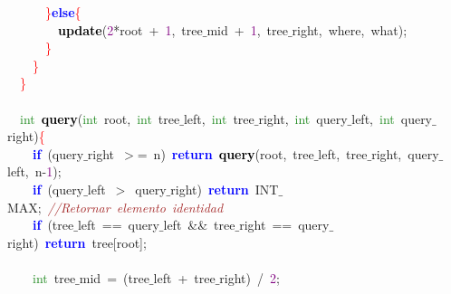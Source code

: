 {{\mbox{}\ \ \ \ \ \ \textcolor{Red}{\}}\textbf{\textcolor{Blue}{else}}\textcolor{Red}{\{} \\
\mbox{}\ \ \ \ \ \ \ \ \textbf{\textcolor{Black}{update}}\textcolor{BrickRed}{(}\textcolor{Purple}{2}\textcolor{BrickRed}{*}root\ \textcolor{BrickRed}{+}\ \textcolor{Purple}{1}\textcolor{BrickRed}{,}\ tree$\_$mid\ \textcolor{BrickRed}{+}\ \textcolor{Purple}{1}\textcolor{BrickRed}{,}\ tree$\_$right\textcolor{BrickRed}{,}\ where\textcolor{BrickRed}{,}\ what\textcolor{BrickRed}{);} \\
\mbox{}\ \ \ \ \ \ \textcolor{Red}{\}} \\
\mbox{}\ \ \ \ \textcolor{Red}{\}} \\
\mbox{}\ \ \textcolor{Red}{\}} \\
\mbox{} \\
\mbox{}\ \ \textcolor{ForestGreen}{int}\ \textbf{\textcolor{Black}{query}}\textcolor{BrickRed}{(}\textcolor{ForestGreen}{int}\ root\textcolor{BrickRed}{,}\ \textcolor{ForestGreen}{int}\ tree$\_$left\textcolor{BrickRed}{,}\ \textcolor{ForestGreen}{int}\ tree$\_$right\textcolor{BrickRed}{,}\ \textcolor{ForestGreen}{int}\ query$\_$left\textcolor{BrickRed}{,}\ \textcolor{ForestGreen}{int}\ query$\_$right\textcolor{BrickRed}{)}\textcolor{Red}{\{} \\
\mbox{}\ \ \ \ \textbf{\textcolor{Blue}{if}}\ \textcolor{BrickRed}{(}query$\_$right\ \textcolor{BrickRed}{$>$=}\ n\textcolor{BrickRed}{)}\ \textbf{\textcolor{Blue}{return}}\ \textbf{\textcolor{Black}{query}}\textcolor{BrickRed}{(}root\textcolor{BrickRed}{,}\ tree$\_$left\textcolor{BrickRed}{,}\ tree$\_$right\textcolor{BrickRed}{,}\ query$\_$left\textcolor{BrickRed}{,}\ n\textcolor{BrickRed}{-}\textcolor{Purple}{1}\textcolor{BrickRed}{);} \\
\mbox{}\ \ \ \ \textbf{\textcolor{Blue}{if}}\ \textcolor{BrickRed}{(}query$\_$left\ \textcolor{BrickRed}{$>$}\ query$\_$right\textcolor{BrickRed}{)}\ \textbf{\textcolor{Blue}{return}}\ INT$\_$MAX\textcolor{BrickRed}{;}\ \textit{\textcolor{Brown}{//Retornar\ elemento\ identidad}} \\
\mbox{}\ \ \ \ \textbf{\textcolor{Blue}{if}}\ \textcolor{BrickRed}{(}tree$\_$left\ \textcolor{BrickRed}{==}\ query$\_$left\ \textcolor{BrickRed}{\&\&}\ tree$\_$right\ \textcolor{BrickRed}{==}\ query$\_$right\textcolor{BrickRed}{)}\ \textbf{\textcolor{Blue}{return}}\ tree\textcolor{BrickRed}{[}root\textcolor{BrickRed}{];} \\
\mbox{} \\
\mbox{}\ \ \ \ \textcolor{ForestGreen}{int}\ tree$\_$mid\ \textcolor{BrickRed}{=}\ \textcolor{BrickRed}{(}tree$\_$left\ \textcolor{BrickRed}{+}\ tree$\_$right\textcolor{BrickRed}{)}\ \textcolor{BrickRed}{/}\ \textcolor{Purple}{2}\textcolor{BrickRed}{;} \\
}}

